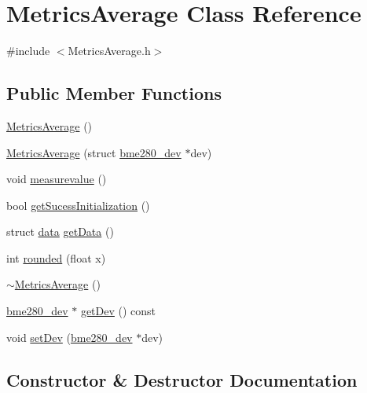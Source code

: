 \hypertarget{class_metrics_average}{}\section{Metrics\+Average Class Reference}
\label{class_metrics_average}


{\ttfamily \#include $<$Metrics\+Average.\+h$>$}

\subsection*{Public Member Functions}
\begin{DoxyCompactItemize}
\item 
\hyperlink{class_metrics_average_ae62764cf04f8b12618021c9c8dda927d}{Metrics\+Average} ()
\item 
\hyperlink{class_metrics_average_a6d76aae6b11e42433bb93c47568de695}{Metrics\+Average} (struct \hyperlink{structbme280__dev}{bme280\+\_\+dev} $\ast$dev)
\item 
void \hyperlink{class_metrics_average_ad7c1ebb802eb2b710fc823f82e4ecf7e}{measurevalue} ()
\item 
bool \hyperlink{class_metrics_average_a17fc55cc103b48439645e4cb48cd62d2}{get\+Sucess\+Initialization} ()
\item 
struct \hyperlink{structdata}{data} \hyperlink{class_metrics_average_aebeda8dfb7b624fe9cbbeb9b6dfc51e5}{get\+Data} ()
\item 
int \hyperlink{class_metrics_average_a225a5cef622b47b5388fec11c7c50df3}{rounded} (float x)
\item 
\hyperlink{class_metrics_average_a9c2595a58728d51bd2bb85ba3258966c}{$\sim$\+Metrics\+Average} ()
\item 
\hyperlink{structbme280__dev}{bme280\+\_\+dev} $\ast$ \hyperlink{class_metrics_average_ad476d4c4f04a3303d236dba4849c8045}{get\+Dev} () const
\item 
void \hyperlink{class_metrics_average_a73810dc84f599b5e2fc3b7b4c34f326c}{set\+Dev} (\hyperlink{structbme280__dev}{bme280\+\_\+dev} $\ast$dev)
\end{DoxyCompactItemize}


\subsection{Constructor \& Destructor Documentation}
\mbox{\label{class_metrics_average_ae62764cf04f8b12618021c9c8dda927d}} 
